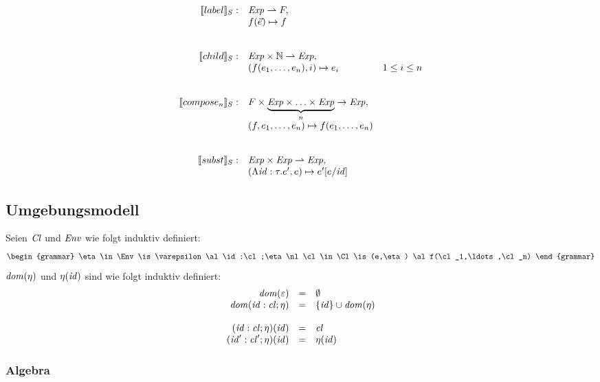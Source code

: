 \documentclass[12pt,a4paper]{article}
\begin{document}
\[\begin{array}{rll}
  \sem{label}_S: & \Exp \pto F, \\
  & f(\vec{e}) \mapsto f \\
  \\\\
  \sem{child}_S: & \Exp \times \N \pto \Exp, \\
  & (f(e_1,\ldots,e_n),i) \mapsto e_i & 1 \le i \le n \\
  \\\\
  \sem{compose_n}_S: & F \times \underbrace{\Exp \times \ldots \times \Exp}_n \to \Exp, \\
  & (f, e_1,\ldots,e_n) \mapsto f(e_1,\ldots,e_n) \\
  \\\\
  \sem{subst}_S: & \Exp \times \Exp \pto \Exp, \\
  & (\Lambda\id:\tau.e',e) \mapsto e'[e/\id] \\
\end{array}\]


\subsection*{Umgebungsmodell}

Seien $\mathit{Cl}$ und $\mathit{Env}$ wie folgt induktiv definiert:
\[\begin{grammar}
  \eta \in \Env
  \is \varepsilon
  \al \id:\cl;\eta
  \nl
  \cl \in \Cl
  \is (e,\eta)
  \al f(\cl_1,\ldots,\cl_n)
\end{grammar}\]
$\mathit{dom}(\eta)$ und $\eta(\mathit{id})$ sind wie folgt induktiv definiert:
\[\begin{array}{rcl}
  \mathit{dom}(\varepsilon) &=& \emptyset \\
  \mathit{dom}(\mathit{id}:\mathit{cl};\eta) &=& \{\mathit{id}\} \cup \mathit{dom}(\eta) \\
  \\
  (\mathit{id}:\mathit{cl};\eta)(\mathit{id}) &=& \mathit{cl} \\
  (\mathit{id}':\mathit{cl}';\eta)(\mathit{id}) &=& \eta(\mathit{id}) \\
\end{array}\]

\subsubsection*{Algebra}
\end{document}
